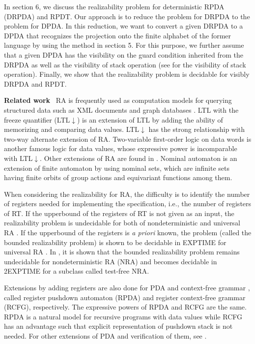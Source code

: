In section 6, we discuss the realizability problem for deterministic RPDA (DRPDA) and RPDT.
Our approach is to reduce the problem for DRPDA to the problem for DPDA.
In this reduction, we want to convert a given DRPDA to a DPDA that recognizes
the projection onto the finite alphabet of the former language by using the method
in section 5.
For this purpose, we further assume that a given DPDA has the visibility
on the guard condition inherited from the DRPDA as well as the visibility
of stack operation (see \cite{AM04} for the visibility of stack operation).
Finally, we show that the realizability problem is decidable for visibly DRPDA and RPDT.
\medskip\par\noindent
{\bf Related work}~
RA is frequently used as
computation models for querying structured data such as XML documents
and graph databases \cite{LV12,LTV15}.
LTL with the freeze quantifier (LTL$\downarrow$) \cite{DL09,DLN07} is
an extension of LTL by adding the ability of memorizing and comparing data values.
LTL$\downarrow$ has the strong relationship with two-way alternate extension of RA.
Two-variable first-order logic on data words \cite{BDMSS11}
is another famous logic for data values,
whose expressive power is incomparable with LTL$\downarrow$.
Other extensions of RA are found in \cite{BKL14,CLTW17,DFSS19,BCGK12}.
Nominal automaton \cite{BKL14} is an extension of finite automaton
by using nominal sets, which are infinite sets having finite orbits
of group actions and equivariant functions among them.

When considering the realizability for RA,
the difficulty is to identify the number of registers
needed for implementing the specification, i.e., the number of registers of RT.
If the upperbound of the registers of RT is not given as an input,
the realizability problem is undecidable for both of nondeterministic and
universal RA \cite{EFR19}.
If the upperbound of the registers is {\em a priori} known,
the problem (called the bounded realizability
problem) is shown to be decidable in EXPTIME for universal RA \cite{KK19}.
In \cite{EFR19}, it is shown that the bounded realizability problem remains undecidable
for nondeterministic RA (NRA)
and becomes decidable in 2EXPTIME for a subclass called test-free NRA.

Extensions by adding registers are also done for PDA \cite{CL15,MRT17,STS21} and
context-free grammar \cite{CK98,STS18,STS19},
called register pushdown automaton (RPDA) and register context-free grammar (RCFG), respectively.
The expressive powers of RPDA and RCFG are the same.
RPDA is a natural model for recursive programs with data values while
RCFG has an advantage such that explicit representation of pushdown stack is not needed.
For other extensions of PDA and verification of them, see \cite{ST12,XO13,RBB10}.
